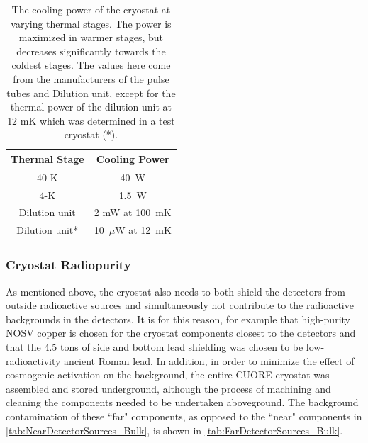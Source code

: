 \begin{table}[htbp]
    \centering
    \caption[The cooling power of the cryostat at varying thermal stages]
    {The cooling power of the cryostat at varying thermal stages.
    The power is maximized in warmer stages, but decreases significantly towards the coldest stages.
    The values here come from the manufacturers of the pulse tubes and Dilution unit, except for the thermal power of the dilution unit at 12 mK which was determined in a test cryostat (*).}
    \label{tab:cryostat_cooling_power}
    \begin{tabular}{c|c}
    \hline
    \hline
    Thermal Stage     & Cooling Power \\
    \hline
    40-K     & 40~W \\
    4-K      & 1.5~W \\
    Dilution unit &  2 mW at 100~mK \\
    Dilution unit*    & 10~$\mu$W at 12~mK \\
    \hline
    \hline
    \end{tabular}
\end{table}

\subsubsection*{Cryostat Radiopurity}
\label{ssec:Cryostat_Radiopurity}
As mentioned above, the cryostat also needs to both shield the detectors from outside radioactive sources and simultaneously not contribute to the radioactive backgrounds in the detectors.
It is for this reason, for example that high-purity NOSV copper is chosen for the cryostat components closest to the detectors and that the 4.5 tons of side and bottom lead shielding was chosen to be low-radioactivity ancient Roman lead.
In addition, in order to minimize the effect of cosmogenic activation on the background, the entire CUORE cryostat was assembled and stored underground, although the process of machining and cleaning the components needed to be undertaken aboveground.
The background contamination of these ``far" components, as opposed to the ``near" components in \autoref{tab:NearDetectorSources_Bulk}, is shown in \autoref{tab:FarDetectorSources_Bulk}. 


